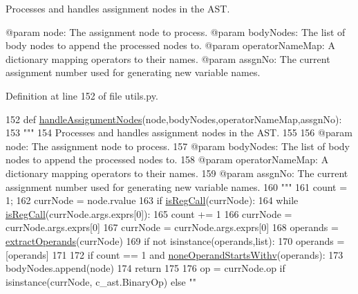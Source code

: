 \begin{DoxyVerb}Processes and handles assignment nodes in the AST.

@param node: The assignment node to process.
@param bodyNodes: The list of body nodes to append the processed nodes to.
@param operatorNameMap: A dictionary mapping operators to their names.
@param assgnNo: The current assignment number used for generating new variable names.
\end{DoxyVerb}
 

Definition at line 152 of file utils.\+py.


\begin{DoxyCode}
152 \textcolor{keyword}{def }\hyperlink{namespacePostProcessor_1_1utils_a8b77a1f205d7dac14e6bdcccdb61e5f6}{handleAssignmentNodes}(node,bodyNodes,operatorNameMap,assgnNo):
153     \textcolor{stringliteral}{"""
}
154 \textcolor{stringliteral}{    Processes and handles assignment nodes in the AST.
}
155 \textcolor{stringliteral}{
}
156 \textcolor{stringliteral}{    @param node: The assignment node to process.
}
157 \textcolor{stringliteral}{    @param bodyNodes: The list of body nodes to append the processed nodes to.
}
158 \textcolor{stringliteral}{    @param operatorNameMap: A dictionary mapping operators to their names.
}
159 \textcolor{stringliteral}{    @param assgnNo: The current assignment number used for generating new variable names.
}
160 \textcolor{stringliteral}{    """}
161     count = 1;
162     currNode = node.rvalue
163     \textcolor{keywordflow}{if} \hyperlink{namespacePostProcessor_1_1utils_a89d6f2461251261de6b862c69fe3c44a}{isRegCall}(currNode):
164         \textcolor{keywordflow}{while} \hyperlink{namespacePostProcessor_1_1utils_a89d6f2461251261de6b862c69fe3c44a}{isRegCall}(currNode.args.exprs[0]):
165             count += 1
166             currNode = currNode.args.exprs[0]
167         currNode = currNode.args.exprs[0]
168         operands = \hyperlink{namespacePostProcessor_1_1utils_a756305ef1f9ed9b8a0f01428433e026e}{extractOperands}(currNode)
169         \textcolor{keywordflow}{if} \textcolor{keywordflow}{not} isinstance(operands,list):
170             operands = [operands]
171 
172         \textcolor{keywordflow}{if} count == 1 \textcolor{keywordflow}{and} \hyperlink{namespacePostProcessor_1_1utils_a379c264b5800e073d327d90d53cb854f}{noneOperandStartsWithv}(operands):
173              bodyNodes.append(node)
174              \textcolor{keywordflow}{return}
175 
176         op = currNode.op \textcolor{keywordflow}{if} isinstance(currNode, c\_ast.BinaryOp) \textcolor{keywordflow}{else} \textcolor{stringliteral}{""}

\end{DoxyCode}
